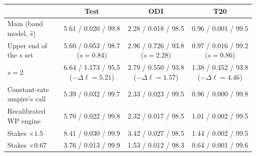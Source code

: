 \begin{tabular}{lccc}
\toprule
 & Test & ODI & T20 \\
\midrule
Main (band model, $\hat s$) & 5.61 / 0.020 / 99.8 & 2.28 / 0.018 / 98.5 & 0.96 / 0.001 / 99.5 \\
Upper end of the $s$ set & 5.60 / 0.053 / 98.7 ($s=0.84$) & 2.96 / 0.726 / 93.8 ($s=2.28$) & 0.97 / 0.016 / 99.2 ($s=0.86$) \\
$s=2$ & 6.64 / 1.173 / 95.5 ($-\Delta\ell=5.21$) & 2.79 / 0.550 / 93.8 ($-\Delta\ell=1.57$) & 1.38 / 0.452 / 93.8 ($-\Delta\ell=4.46$) \\
Constant-rate umpire's call & 5.39 / 0.032 / 99.7 & 2.33 / 0.023 / 99.5 & 0.96 / 0.000 / 99.8 \\
Recalibrated WP engine & 5.70 / 0.022 / 99.8 & 2.32 / 0.017 / 98.5 & 1.01 / 0.002 / 99.5 \\
Stakes $\times1.5$ & 8.41 / 0.030 / 99.9 & 3.42 / 0.027 / 98.5 & 1.44 / 0.002 / 99.5 \\
Stakes $\times0.67$ & 3.76 / 0.013 / 99.9 & 1.53 / 0.012 / 98.3 & 0.64 / 0.001 / 99.6 \\
\bottomrule
\end{tabular}
